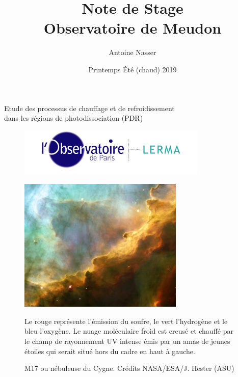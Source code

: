 \documentclass[11pt,a4paper]{article}
\title{Note de Stage\\Observatoire de Meudon}
\author{Antoine Nasser}
\date{Printemps Été (chaud) 2019}
\begin{document}
\begin{spacing}{0.98}


\maketitle
\begin{center}{\Large Etude des processus de chauffage et de refroidissement \\ dans les régions de photodissociation (PDR)}\end{center}


\setcounter{secnumdepth}{4}
\vfill
\begin{figure}[!hb]
        \centering 
        \includegraphics[trim = {0 0 0 0cm},clip,width=0.8\textwidth]{figure/LERMA2.jpg}
\end{figure}
\vfill

\newpage 

\tableofcontents

\setcounter{figure}{0}    

\newpage


\begin{figure}[!p]
    \centering
    \includegraphics[trim = {0 0 0 0},clip, width=0.7\textwidth]{figure/omega.pdf}
    \vspace{1em}
    \caption{M17 ou nébuleuse du Cygne.
    Crédits NASA/ESA/J. Hester (ASU)}
    \vspace{1em}
    \begin{minipage}{\textwidth}
    Le rouge représente l'émission du soufre, le vert l'hydrogène et le bleu l'oxygène. Le nuage moléculaire froid est creusé et chauffé par le champ de rayonnement UV intense émis par un amas de jeunes étoiles qui serait situé hors du cadre en haut à gauche.
    \end{minipage} 
    \label{fig:m17}
\end{figure}{}



\end{spacing}
\end{document}
